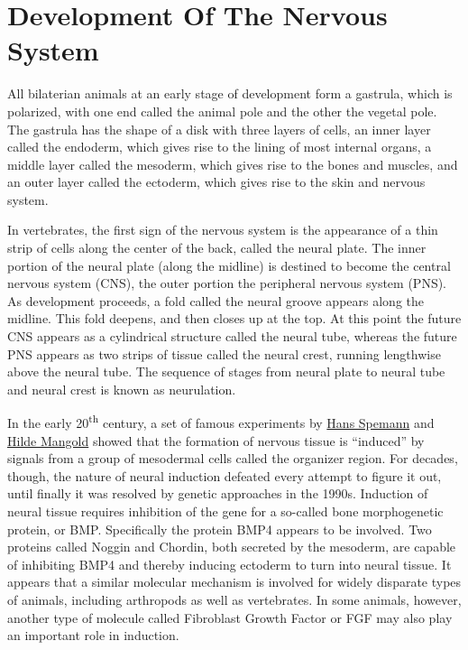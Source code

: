 \hypertarget{development-of-the-nervous-system}{%
\section{Development Of The Nervous System}\label{development-of-the-nervous-system}}

All bilaterian animals at an early stage of development form a gastrula, which is polarized, with one end called the animal pole and the other the vegetal pole. The gastrula has the shape of a disk with three layers of cells, an inner layer called the endoderm, which gives rise to the lining of most internal organs, a middle layer called the mesoderm, which gives rise to the bones and muscles, and an outer layer called the ectoderm, which gives rise to the skin and nervous system.

In vertebrates, the first sign of the nervous system is the appearance of a thin strip of cells along the center of the back, called the neural plate. The inner portion of the neural plate (along the midline) is destined to become the central nervous system (CNS), the outer portion the peripheral nervous system (PNS). As development proceeds, a fold called the neural groove appears along the midline. This fold deepens, and then closes up at the top. At this point the future CNS appears as a cylindrical structure called the neural tube, whereas the future PNS appears as two strips of tissue called the neural crest, running lengthwise above the neural tube. The sequence of stages from neural plate to neural tube and neural crest is known as neurulation.

In the early 20\textsuperscript{th} century, a set of famous experiments by \href{https://en.wikipedia.org/wiki/Hans_Spemann}{Hans Spemann} and \href{https://en.wikipedia.org/wiki/Hilde_Mangold}{Hilde Mangold} showed that the formation of nervous tissue is ``induced'' by signals from a group of mesodermal cells called the organizer region. For decades, though, the nature of neural induction defeated every attempt to figure it out, until finally it was resolved by genetic approaches in the 1990s. Induction of neural tissue requires inhibition of the gene for a so-called bone morphogenetic protein, or BMP. Specifically the protein BMP4 appears to be involved. Two proteins called Noggin and Chordin, both secreted by the mesoderm, are capable of inhibiting BMP4 and thereby inducing ectoderm to turn into neural tissue. It appears that a similar molecular mechanism is involved for widely disparate types of animals, including arthropods as well as vertebrates. In some animals, however, another type of molecule called Fibroblast Growth Factor or FGF may also play an important role in induction.

